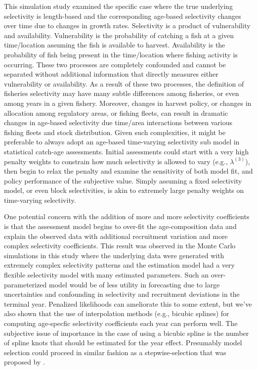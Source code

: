 This simulation study examined the specific case where the true underlying selectivity is length-based and the corresponding age-based selectivity changes over time due to changes in growth rates.  Selectivity is a product of vulnerability and availability.  Vulnerability is the probability of catching a fish at a given time/location assuming the fish is available to harvest.  Availability is the probability of fish being present in the time/location where fishing activity is occurring.  These two processes are completely confounded and cannot be separated without additional information that directly measures either vulnerability or availability.  As a result of these two processes, the definition of fisheries selectivity may have many subtle differences among fisheries, or even among years in a given fishery.  Moreover, changes in harvest policy, or changes in allocation among regulatory areas, or fishing fleets, can result in dramatic changes in age-based selectivity due time/area interactions between various fishing fleets and stock distribution.  Given such complexities, it might be preferable to always adopt an age-based time-varying selectivity sub model in statistical catch-age assessments. Initial assessments could start with a very high penalty weights to constrain how much selectivity is allowed to vary (e.g., $\lambda^{(3)}$), then begin to relax the penalty and examine the sensitivity of both model fit, and policy performance of the subjective value.  Simply assuming a fixed selectivity model, or even block selectivities, is akin to extremely large penalty weights on time-varying selectivity.

One potential concern with the addition of more and more selectivity coefficients is that the assessment model begins to over-fit the age-composition data and explain the observed data with additional recruitment variation and more complex selectivity coefficients.  This result was observed in the Monte Carlo simulations in this study where the underlying data were generated with extremely complex selectivity patterns and the estimation model had a very flexible selectivity model with many estimated parameters.  Such an over-parameterized model would be of less utility in forecasting due to large uncertainties and confounding in selectivity and recruitment deviations in the terminal year.  Penalized likelihoods can ameliorate this to some extent, but we've also shown that the use of interpolation methods (e.g., bicubic splines) for computing age-specfic selectivity coefficients each year can perform well.  The subjective issue of importance in the case of using a bicubic spline is the number of spline knots that should be estimated for the year effect.  Presumably model selection could proceed in similar fashion as a stepwise-selection that was proposed by  \cite{thorson2012stepwise}.

